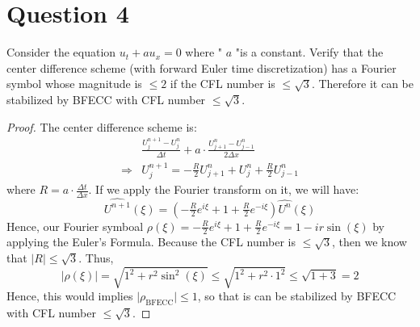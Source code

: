 \section{Question 4}

\begin{question}
    Consider the equation $u_t+a u_x=0$ where " $a$ "is a constant. Verify that the center difference scheme (with forward Euler time discretization) has a Fourier symbol whose magnitude is $\leqslant 2$ if the CFL number is $\leqslant \sqrt{3}$. Therefore it can be stabilized by BFECC with CFL number $\leqslant \sqrt{3}$.
\end{question}

\begin{answer}
    \begin{proof}
        The center difference scheme is:
        \begin{equation}
            \begin{aligned}
                &\tfrac{U_j^{n+1} - U_j^n}{\Delta t} + a\cdot \tfrac{U_{j+1}^n - U_{j-1}^{n}}{2\Delta x}\\
                \Rightarrow &U_j^{n+1} = -\tfrac{R}{2}U_{j+1}^n + U_j^n + \tfrac{R}{2}U_{j-1}^n
            \end{aligned}
        \end{equation}
        where $R = a\cdot \tfrac{\Delta t}{\Delta x}$. If we apply the Fourier transform on it, we will have:
        \begin{equation}
            \widehat{U^{n+1}}(\xi) = (-\tfrac{R}{2}e^{i\xi} + 1 + \tfrac{R}{2}e^{-i\xi})\widehat{U^n}(\xi)
        \end{equation}
        Hence, our Fourier symboal $\rho(\xi) = -\tfrac{R}{2}e^{i\xi} + 1 + \tfrac{R}{2}e^{-i\xi} = 1-ir\sin(\xi)$ by applying the Euler's Formula. Because the CFL number is $\leq \sqrt{3}$, then we know that $\lvert R \rvert \leq \sqrt{3}$. Thus,
        \begin{equation}
            \lvert \rho(\xi) \rvert = \sqrt{1^2 + r^2\sin^2(\xi)} \leq \sqrt{1^2 + r^2 \cdot 1^2} \leq \sqrt{1+3} = 2
        \end{equation}
        Hence, this would implies $\lvert \rho_{\text{BFECC}} \rvert \leq 1$, so that is can be stabilized by BFECC with CFL number $\leq \sqrt{3}$.
    \end{proof}
\end{answer}